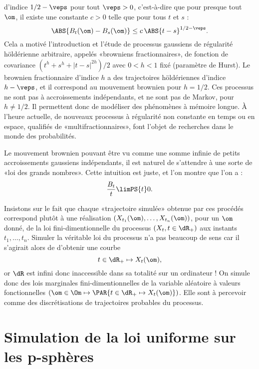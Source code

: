 d'indice $1/2-\veps$ pour tout $\veps>0$, c'est-à-dire que pour presque tout
$\om$, il existe une constante $c>0$ telle que pour tous $t$ et $s$ :
$$
\ABS{B_t(\om)-B_s(\om)} \leq c\,\ABS{t-s}^{1/2-\veps}.
$$
Cela a motivé l'introduction et l'étude de processus gaussiens de
régularité höldérienne arbitraire, appelés «browniens fractionnaires», de
fonction de covariance $(t^h+s^h+|t-s|^{2h})/2$ avec $0<h<1$ fixé (paramètre
de Hurst). Le brownien fractionnaire d'indice $h$ a des trajectoires
höldériennes d'indice $h-\veps$, et il correspond au mouvement brownien pour
$h=1/2$. Ces processus ne sont pas à accroissements indépendants, et ne sont
pas de Markov, pour $h\neq 1/2$. Il permettent donc de modéliser des
phénomènes à mémoire longue. À l'heure actuelle, de nouveaux processus à
régularité non constante en temps ou en espace, qualifiés de
«multifractionnaires», font l'objet de recherches dans le monde des
probabilités.

\begin{rem}
  Le mouvement brownien pouvant être vu comme une somme infinie de petits
  accroissements gaussiens indépendants, il est naturel de s'attendre à une
  sorte de «loi des grands nombres». Cette intuition est juste, et l'on montre
  que l'on a :
  \begin{equation}
    \frac{B_t}{t} \limPS{t} 0.\label{eq:LGN-brown}
  \end{equation}
\end{rem}

\begin{rem}
  Insistons sur le fait que chaque «trajectoire simulée» obtenue par ces
  procédés correspond plutôt à une réalisation
  $(X_{t_1}(\om),\ldots,X_{t_n}(\om))$, pour un $\om$ donné, de la loi
  fini-dimentionnelle du processus $(X_t,t\in\dR_+)$ aux instants
  $t_1,\ldots,t_n$.  Simuler la véritable loi du processus n'a pas beaucoup de
  sens car il s'agirait alors de d'obtenir une courbe 
  $$t\in\dR_+\mapsto X_t(\om),$$
  or $\dR$ est infini donc inaccessible dans sa
  totalité sur un ordinateur !  On simule donc des lois marginales
  fini-dimentionnelles de la variable aléatoire à valeurs fonctionnelles
  $(\om\in\Om\mapsto\PAR{t\in\dR_+\mapsto X_t(\om)})$. Elle sont à percevoir
  comme des discrétisations de trajectoires probables du processus.
\end{rem}

%
\section{Simulation de la loi uniforme sur les p-sphères}
\label{se:unif-pspheres}
%

